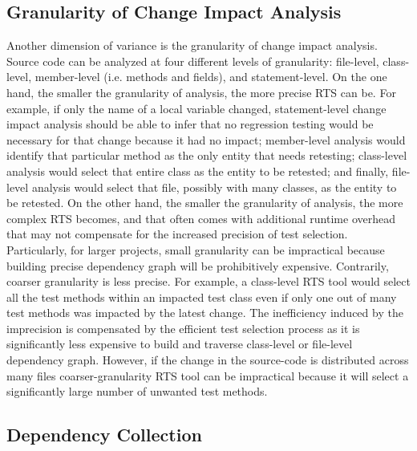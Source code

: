 \subsection{Granularity of Change Impact Analysis}

Another dimension of variance is the granularity of change impact analysis. Source code can be analyzed at four different levels of granularity: file-level, class-level, member-level (i.e. methods and fields), and statement-level. On the one hand, the smaller the granularity of analysis, the more precise RTS can be. For example, if only the name of a local variable changed, statement-level change impact analysis should be able to infer that no regression testing would be necessary for that change because it had no impact; member-level analysis would identify that particular method as the only entity that needs retesting; class-level analysis would select that entire class as the entity to be retested; and finally, file-level analysis would select that file, possibly with many classes, as the entity to be retested. On the other hand, the smaller the granularity of analysis, the more complex RTS becomes, and that often comes with additional runtime overhead that may not compensate for the increased precision of test selection. Particularly, for larger projects, small granularity can be impractical because building precise dependency graph will be prohibitively expensive. Contrarily, coarser granularity is less precise. For example, a class-level RTS tool would select all the test methods within an impacted test class even if only one out of many test methods was impacted by the latest change. The inefficiency induced by the imprecision is compensated by the efficient test selection process as it is significantly less expensive to build and traverse class-level or file-level dependency graph. However, if the change in the source-code is distributed across many files coarser-granularity RTS tool can be impractical because it will select a significantly large number of unwanted test methods. 

\subsection{Dependency Collection}

